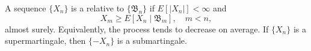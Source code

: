 A sequence $\{X_n\}$ is a  relative to $\{\mathfrak{B}_n\}$ if $E[|X_n|] < \infty$ and
$$X_m \geq E[X_n \mid \mathfrak{B}_m], \quad m < n,$$
almost surely. Equivalently, the process tends to decrease on average. If $\{X_n\}$ is a supermartingale, then $\{-X_n\}$ is a submartingale.
